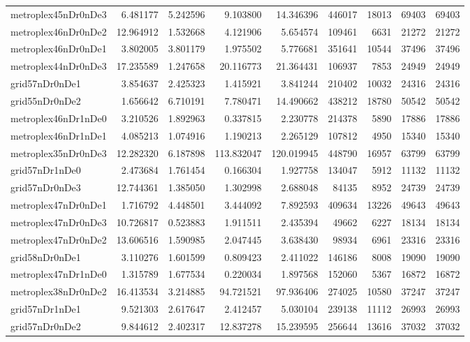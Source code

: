 \begin{longtable}{|l|r|r|r|r|r|r|r|r|}
metroplex45nDr0nDe3 & 6.481177 & 5.242596 & 9.103800 & 14.346396 & 446017 & 18013 & 69403 & 69403 \\
metroplex46nDr0nDe2 & 12.964912 & 1.532668 & 4.121906 & 5.654574 & 109461 & 6631 & 21272 & 21272 \\
metroplex46nDr0nDe1 & 3.802005 & 3.801179 & 1.975502 & 5.776681 & 351641 & 10544 & 37496 & 37496 \\
metroplex44nDr0nDe3 & 17.235589 & 1.247658 & 20.116773 & 21.364431 & 106937 & 7853 & 24949 & 24949 \\
grid57nDr0nDe1 & 3.854637 & 2.425323 & 1.415921 & 3.841244 & 210402 & 10032 & 24316 & 24316 \\
grid55nDr0nDe2 & 1.656642 & 6.710191 & 7.780471 & 14.490662 & 438212 & 18780 & 50542 & 50542 \\
metroplex46nDr1nDe0 & 3.210526 & 1.892963 & 0.337815 & 2.230778 & 214378 & 5890 & 17886 & 17886 \\
metroplex46nDr1nDe1 & 4.085213 & 1.074916 & 1.190213 & 2.265129 & 107812 & 4950 & 15340 & 15340 \\
metroplex35nDr0nDe3 & 12.282320 & 6.187898 & 113.832047 & 120.019945 & 448790 & 16957 & 63799 & 63799 \\
grid57nDr1nDe0 & 2.473684 & 1.761454 & 0.166304 & 1.927758 & 134047 & 5912 & 11132 & 11132 \\
grid57nDr0nDe3 & 12.744361 & 1.385050 & 1.302998 & 2.688048 & 84135 & 8952 & 24739 & 24739 \\
metroplex47nDr0nDe1 & 1.716792 & 4.448501 & 3.444092 & 7.892593 & 409634 & 13226 & 49643 & 49643 \\
metroplex47nDr0nDe3 & 10.726817 & 0.523883 & 1.911511 & 2.435394 & 49662 & 6227 & 18134 & 18134 \\
metroplex47nDr0nDe2 & 13.606516 & 1.590985 & 2.047445 & 3.638430 & 98934 & 6961 & 23316 & 23316 \\
grid58nDr0nDe1 & 3.110276 & 1.601599 & 0.809423 & 2.411022 & 146186 & 8008 & 19090 & 19090 \\
metroplex47nDr1nDe0 & 1.315789 & 1.677534 & 0.220034 & 1.897568 & 152060 & 5367 & 16872 & 16872 \\
metroplex38nDr0nDe2 & 16.413534 & 3.214885 & 94.721521 & 97.936406 & 274025 & 10580 & 37247 & 37247 \\
grid57nDr1nDe1 & 9.521303 & 2.617647 & 2.412457 & 5.030104 & 239138 & 11112 & 26993 & 26993 \\
grid57nDr0nDe2 & 9.844612 & 2.402317 & 12.837278 & 15.239595 & 256644 & 13616 & 37032 & 37032 \\

\end{longtable}
